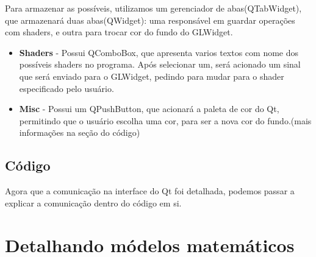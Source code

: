 \documentclass{ol-softwaremanual}
\begin{document}
Para armazenar as possíveis, utilizamos um gerenciador 
de abas(QTabWidget), que armazenará duas abas(QWidget): uma 
responsável em guardar operações com shaders, e outra 
para trocar cor do fundo do GLWidget.

\begin{itemize}
    \item \textbf{Shaders} - Possui QComboBox, que apresenta 
    varios textos com nome dos possíveis shaders no 
    programa. Após selecionar um, será acionado um sinal 
    que será enviado para o GLWidget, pedindo para mudar 
    para o shader especificado pelo usuário.
    \item \textbf{Misc} - Possui um QPushButton, que acionará a 
    paleta de cor do Qt, permitindo que o usuário escolha 
    uma cor, para ser a nova cor do fundo.(mais informações 
    na seção do código)
\end{itemize}

\subsection{Código}

Agora que a comunicação na interface do Qt foi detalhada,
podemos passar a explicar a comunicação dentro do código em si.




\section{Detalhando módelos matemáticos}
\end{document}
